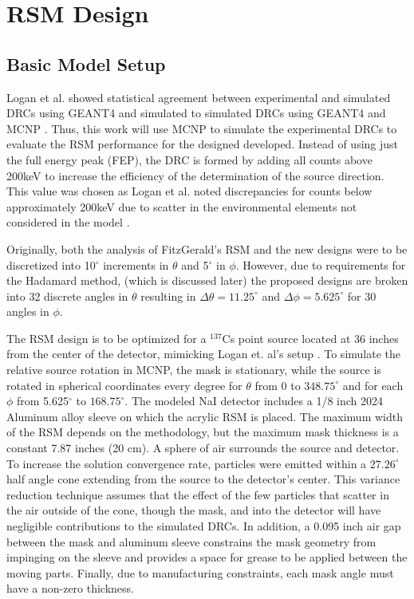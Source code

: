 \documentclass[3p,times]{elsarticle}
\begin{document}
\section{RSM Design}
\subsection{Basic Model Setup}
Logan et al.\cite{Logan2017} showed statistical agreement between experimental and simulated DRCs using GEANT4 \cite{Agostinelli03} and simulated to simulated DRCs using GEANT4 and MCNP \cite{Goorley13}.
Thus, this work will use MCNP to simulate the experimental DRCs to evaluate the RSM performance for the designed developed.  
Instead of using just the full energy peak (FEP), the DRC is formed by adding all counts above 200keV to increase the efficiency of the determination of the source direction.  
This value was chosen as Logan et al. noted discrepancies for counts below approximately 200keV due to scatter in the  environmental elements not considered in the model \cite{Logan2017}.

Originally, both the analysis of FitzGerald's RSM and the new designs were to be discretized into 10$^\circ$ increments in $\theta$ and 5$^\circ$ in $\phi$.  
However, due to requirements for the Hadamard method, (which is discussed later) 
the proposed designs are broken into 32 discrete angles in $\theta$ resulting in $\Delta\theta=11.25^\circ$ and $\Delta\phi=5.625^\circ$ for 30 angles in $\phi$.

The RSM design is to be optimized for a $^{137}$Cs point source located at 36 inches from the center of the detector, mimicking Logan et. al's setup \cite{Logan2017}.  
To simulate the relative source rotation in MCNP, the mask is stationary, while the source is rotated in spherical coordinates every degree for $\theta$ from 0 to $348.75^\circ$ and for each $\phi$ from 5.625$^\circ$ to $168.75^\circ$.  
The modeled NaI detector includes a 1/8 inch 2024 Aluminum alloy sleeve on which the acrylic RSM is placed. 
The maximum width of the RSM depends on the methodology, but the maximum mask thickness is a constant 7.87 inches (20 cm).  
A sphere of air surrounds the source and detector.  
To increase the solution convergence rate, particles were emitted within a $27.26^\circ$ half angle cone extending from the source to the detector's center.  
This variance reduction technique assumes that the effect of the few particles that 
scatter in the air outside of the cone, though the mask, and into the detector will have negligible contributions to the simulated DRCs.   
In addition, a 0.095 inch air gap between the mask and aluminum sleeve constrains the mask geometry from impinging on the sleeve and provides a space for grease to be applied between the moving parts.
Finally, due to manufacturing constraints, each mask angle must have a non-zero thickness.
\end{document}
